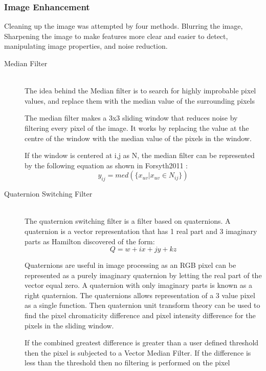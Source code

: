 \subsubsection{Image Enhancement}
Cleaning up the image was attempted by four methods. Blurring the image, Sharpening the image to make features more clear and easier to detect, manipulating image properties, and noise reduction. 
\begin{description}
\item[Median Filter]\hfill \\The idea behind the Median filter is to search for highly improbable pixel values, and replace them with the median value of the surrounding pixels \cite{davies2012computer}

The median filter makes a 3x3 sliding window that reduces noise by filtering every pixel of the image. It works by replacing the value at the centre of the window with the median value of the pixels in the window.

If the window is centered at i,j as N, the median filter can be represented by the following equation as shown in Forsyth2011 \cite{forsyth2011computer}:
\begin{equation}
y_{ij}=med(\lbrace x_{uv}|x_{uv}\in N_{ij} \rbrace)
\end{equation}

\item[Quaternion Switching Filter]\hfill \\
The quaternion switching filter \cite{web:QNSF} is a filter based on quaternions.
A quaternion is a vector representation that has 1 real part and 3 imaginary parts as Hamilton discovered \cite{article:Hamilton1844} of the form:
\begin{equation}
Q=w+ix+jy+kz
\end{equation} 

Quaternions are useful in image processing as an RGB pixel can be represented as a purely imaginary quaternion by letting the real part of the vector equal zero. A quaternion with only imaginary parts is known as a right quaternion.\cite{article:Hamilton1866}
The quaternions allows representation of a 3 value pixel as a single function. Then quaternion unit transform theory can be used to find the pixel chromaticity difference and pixel intensity difference for the pixels in the sliding window.

If the combined greatest difference is greater than a user defined threshold then the pixel is subjected to a Vector Median Filter. If the difference is less than the threshold then no filtering is performed on the pixel
\end{description}
 
